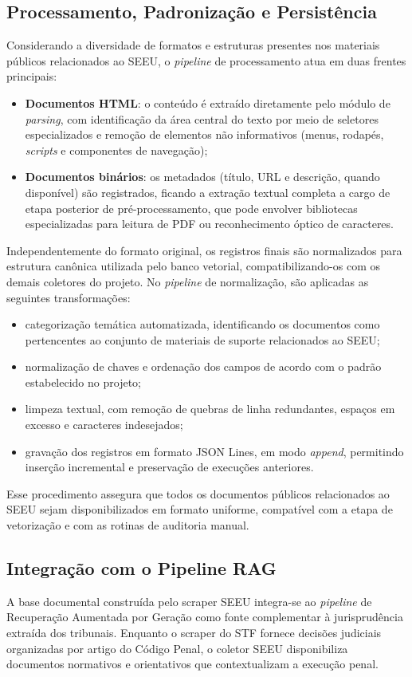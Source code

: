 \subsection{Processamento, Padronização e Persistência}
Considerando a diversidade de formatos e estruturas presentes nos materiais públicos relacionados ao SEEU, o \textit{pipeline} de processamento atua em duas frentes principais:

\begin{itemize}
  \item \textbf{Documentos HTML}: o conteúdo é extraído diretamente pelo módulo de \textit{parsing}, com identificação da área central do texto por meio de seletores especializados e remoção de elementos não informativos (menus, rodapés, \textit{scripts} e componentes de navegação);
  \item \textbf{Documentos binários}: os metadados (título, URL e descrição, quando disponível) são registrados, ficando a extração textual completa a cargo de etapa posterior de pré-processamento, que pode envolver bibliotecas especializadas para leitura de PDF ou reconhecimento óptico de caracteres.
\end{itemize}

Independentemente do formato original, os registros finais são normalizados para estrutura canônica utilizada pelo banco vetorial, compatibilizando-os com os demais coletores do projeto. No \textit{pipeline} de normalização, são aplicadas as seguintes transformações:
\begin{itemize}
  \item categorização temática automatizada, identificando os documentos como pertencentes ao conjunto de materiais de suporte relacionados ao SEEU;
  \item normalização de chaves e ordenação dos campos de acordo com o padrão estabelecido no projeto;
  \item limpeza textual, com remoção de quebras de linha redundantes, espaços em excesso e caracteres indesejados;
  \item gravação dos registros em formato JSON Lines, em modo \textit{append}, permitindo inserção incremental e preservação de execuções anteriores.
\end{itemize}

Esse procedimento assegura que todos os documentos públicos relacionados ao SEEU sejam disponibilizados em formato uniforme, compatível com a etapa de vetorização e com as rotinas de auditoria manual.

\subsection{Integração com o Pipeline RAG}
A base documental construída pelo scraper SEEU integra-se ao \textit{pipeline} de Recuperação Aumentada por Geração como fonte complementar à jurisprudência extraída dos tribunais. Enquanto o scraper do STF fornece decisões judiciais organizadas por artigo do Código Penal, o coletor SEEU disponibiliza documentos normativos e orientativos que contextualizam a execução penal.

